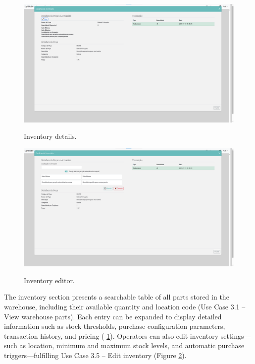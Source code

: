 \begin{figure}[h]
  \caption{Inventory details.}
  \centering
  \includegraphics[width=\textwidth]{figs/Implementation/warehouse/inventoryDetails}
  \label{fig:inventoryDetails}
\end{figure}

\begin{figure}[h]
  \caption{Inventory editor.}
  \centering
  \includegraphics[width=\textwidth]{figs/Implementation/warehouse/inventoryEdit}
  \label{fig:inventoryEdit}
\end{figure}


The inventory section presents a searchable table of all parts stored in the warehouse, including their available quantity and location code (Use Case 3.1 – View warehouse parts). Each entry can be expanded to display detailed information such as stock thresholds, purchase configuration parameters, transaction history, and pricing ( \ref{fig:inventoryDetails}). Operators can also edit inventory settings—such as location, minimum and maximum stock levels, and automatic purchase triggers—fulfilling Use Case 3.5 – Edit inventory (Figure \ref{fig:inventoryEdit}).


